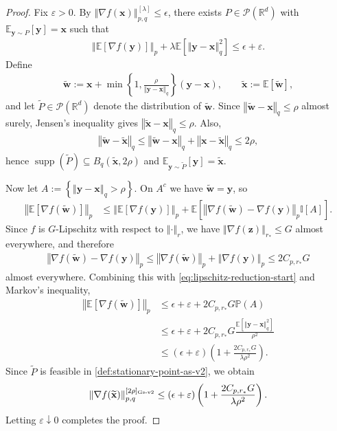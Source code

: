 \documentclass{article}
\def \y {\mathbf{y}}
\def \E {\mathbb{E}}
\def \x {\mathbf{x}}
\def \z {\mathbf{z}}
\def \w {\mathbf{w}}
\def \R {\mathbb{R}}
\def \P {\mathcal{P}}
\def \xt {\widetilde{\x}}
\def \wt {\widetilde{\w}}
\newcommand \indicator[1]{\mathbb{I}[#1]}
\DeclareMathOperator*{\supp}{supp}
\newcommand{\norm}[1]{\left\Vert#1\right\Vert}
\def \Pr    {\mathbb{P}}
\newcommand{\sqbrac}[1]{\left[#1\right]}
\newcommand{\brac}[1]{\left(#1\right)}
\newcommand{\cbrac}[1]{\left\{#1\right\}}
\begin{document}
\begin{proof}
Fix $\varepsilon>0$. By $\norm{\nabla f(\x)}_{p,q}^{[\lambda]}\le\epsilon$, there exists $P\in\P(\R^d)$ with $\E_{\y\sim P}[\y]=\x$ such that
\begin{align}
    \norm{\E\sqbrac{\nabla f(\y)}}_p+\lambda\E\sqbrac{\norm{\y-\x}_q^2}\le \epsilon+\varepsilon. \label{eq:lipschitz-reduction-start}
\end{align}
Define
\begin{align*}
    \wt:=\x+\min\cbrac{1,\frac{\rho}{\norm{\y-\x}_q}}(\y-\x),
    \qquad
    \xt:=\E[\wt],
\end{align*}
and let $\widetilde P\in\P(\R^d)$ denote the distribution of $\wt$. Since $\norm{\wt-\x}_q\le \rho$ almost surely, Jensen's inequality gives $\norm{\xt-\x}_q\le \rho$. Also,
\begin{align*}
    \norm{\wt-\xt}_q\le \norm{\wt-\x}_q+\norm{\x-\xt}_q\le 2\rho,
\end{align*}
hence $\supp(\widetilde P)\subseteq B_q(\xt,2\rho)$ and $\E_{\y\sim\widetilde P}[\y]=\xt$.

Now let $A:=\cbrac{\norm{\y-\x}_q>\rho}$. On $A^c$ we have $\wt=\y$, so
\begin{align*}
    \norm{\E\sqbrac{\nabla f(\wt)}}_p
    &\le \norm{\E\sqbrac{\nabla f(\y)}}_p+\E\sqbrac{\norm{\nabla f(\wt)-\nabla f(\y)}_p\indicator{A}}.
\end{align*}
Since $f$ is $G$-Lipschitz with respect to $\norm{\cdot}_r$, we have $\norm{\nabla f(\z)}_{r_*}\le G$ almost everywhere, and therefore
\begin{align*}
    \norm{\nabla f(\wt)-\nabla f(\y)}_p
    \le \norm{\nabla f(\wt)}_p+\norm{\nabla f(\y)}_p
    \le 2C_{p,r_*}G
\end{align*}
almost everywhere. Combining this with \eqref{eq:lipschitz-reduction-start} and Markov's inequality,
\begin{align*}
    \norm{\E\sqbrac{\nabla f(\wt)}}_p
    &\le \epsilon+\varepsilon+2C_{p,r_*}G\Pr(A) \\
    &\le \epsilon+\varepsilon+2C_{p,r_*}G\frac{\E\sqbrac{\norm{\y-\x}_q^2}}{\rho^2} \\
    &\le (\epsilon+\varepsilon)\brac{1+\frac{2C_{p,r_*}G}{\lambda\rho^2}}.
\end{align*}
Since $\widetilde P$ is feasible in \cref{def:stationary-point-as-v2}, we obtain
\begin{align*}
    \norm{\nabla f(\xt)}_{p,q}^{[2\rho]_{\textnormal{Gs-v2}}}
    \le (\epsilon+\varepsilon)\brac{1+\frac{2C_{p,r_*}G}{\lambda\rho^2}}.
\end{align*}
Letting $\varepsilon\downarrow0$ completes the proof.
\end{proof}
\end{document}
